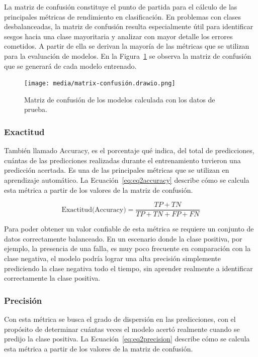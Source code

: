 \documentclass[11pt,a4paper,spanish]{book}
\numberwithin{equation}{chapter}
\numberwithin{figure}{chapter}
\begin{document}
La matriz de confusión constituye el punto de partida para el cálculo de las principales 
métricas de rendimiento en clasificación. En problemas con clases desbalanceadas, la 
matriz de confusión resulta especialmente útil para identificar sesgos hacia una clase 
mayoritaria y analizar con mayor detalle los errores cometidos. A partir de ella se 
derivan la mayoría de las métricas que se utilizan para la evaluación de modelos. En la 
Figura~\ref{fig:figMatrixConfusion} se observa la matriz de confusión que se generará 
de cada modelo entrenado. 



\begin{figure}[h]
    \centering
    \texttt{[image: media/matrix-confusión.drawio.png]}
    \caption{Matriz de confusión de los modelos calculada con los datos de prueba.}
    \label{fig:figMatrixConfusion}
\end{figure}


\subsubsection{Exactitud}

También llamado Accuracy, es el porcentaje qué indica, del total de predicciones, 
cuántas de las predicciones realizadas durante el entrenamiento tuvieron una predicción 
acertada. Es una de las principales métricas que se utilizan en aprendizaje automático. 
La Ecuación~\eqref{eq:eq2accuracy} describe cómo se calcula esta métrica a partir de 
los valores de la matriz de confusión. 

\begin{equation}\label{eq:eq2accuracy}
\text{Exactitud(Accuracy)} = \frac{TP + TN}{TP + TN + FP + FN}
\end{equation}

Para poder obtener un valor confiable de esta métrica se requiere un conjunto de datos 
correctamente balanceado.  En un escenario donde la clase positiva, por ejemplo, la 
presencia de una falla, es muy poco frecuente en comparación con la clase negativa, el 
modelo podría lograr una alta precisión simplemente prediciendo la clase negativa todo 
el tiempo, sin aprender realmente a identificar correctamente la clase positiva.

\subsubsection{Precisión}

Con esta métrica se busca el grado de dispersión en las predicciones, con el propósito 
de determinar cuántas veces el modelo acertó realmente cuando se predijo la clase 
positiva. La Ecuación~\eqref{eq:eq2precision} describe cómo se calcula esta métrica a 
partir de los valores de la matriz de confusión. 
\end{document}
